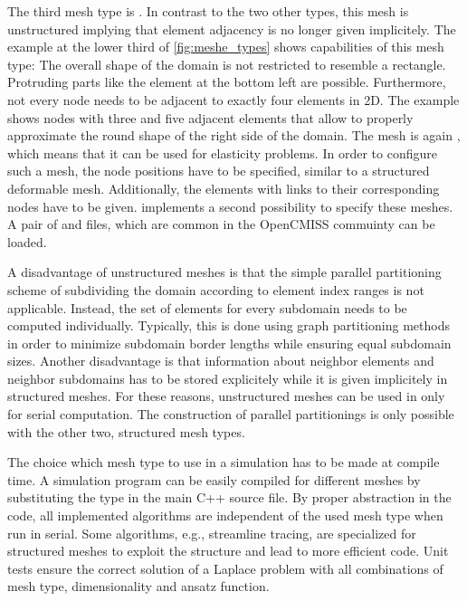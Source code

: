 The third mesh type is . In contrast to the two other types, this mesh is unstructured implying that element adjacency is no longer given implicitely.
The example at the lower third of \cref{fig:meshe_types} shows capabilities of this mesh type: The overall shape of the domain is not restricted to resemble a rectangle. Protruding parts like the element at the bottom left are possible. Furthermore, not every node needs to be adjacent to exactly four elements in 2D. The example shows nodes with three and five adjacent elements that allow to properly approximate the round shape of the right side of the domain. The mesh is again , which means that it can be used for elasticity problems.
In order to configure such a mesh, the node positions have to be specified, similar to a structured deformable mesh. Additionally, the elements with links to their corresponding nodes have to be given.
\Opendihu{} implements a second possibility to specify these meshes. A pair of  and  files, which are common in the OpenCMISS commuinty can be loaded.

A disadvantage of unstructured meshes is that the simple parallel partitioning scheme of subdividing the domain according to element index ranges is not applicable. Instead, the set of elements for every subdomain needs to be computed individually. Typically, this is done using graph partitioning methods in order to minimize subdomain border lengths while ensuring equal subdomain sizes. Another disadvantage is that information about neighbor elements and neighbor subdomains has to be stored explicitely while it is given implicitely in structured meshes.
For these reasons, unstructured meshes can be used in \opendihu{} only for serial computation. The construction of parallel partitionings is only possible with the other two, structured mesh types.

The choice which mesh type to use in a simulation has to be made at compile time. A simulation program can be easily compiled for different meshes by substituting the type in the main C++ source file.
By proper abstraction in the code, all implemented algorithms are independent of the used mesh type when run in serial. Some algorithms, e.g., streamline tracing, are specialized for structured meshes to exploit the structure and lead to more efficient code. Unit tests ensure the correct solution of a Laplace problem with all combinations of mesh type, dimensionality and ansatz function.

